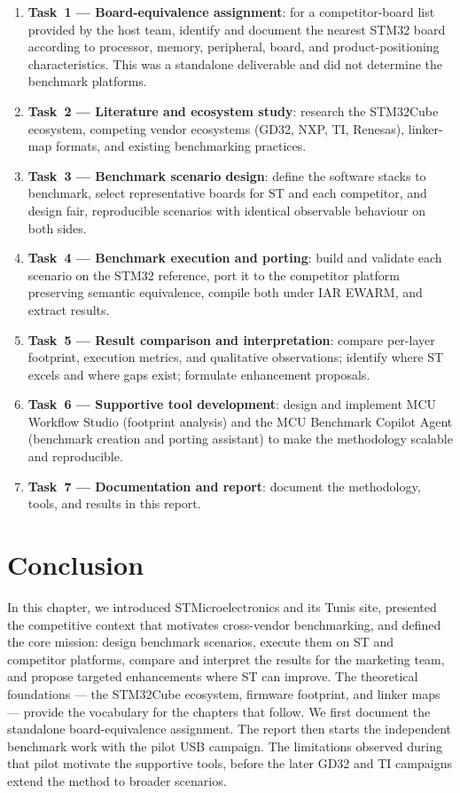 \begin{enumerate}
\item \textbf{Task~1 --- Board-equivalence assignment}: for a competitor-board list
provided by the host team, identify and document the nearest STM32 board according to
processor, memory, peripheral, board, and product-positioning characteristics. This was a
standalone deliverable and did not determine the benchmark platforms.
\item \textbf{Task~2 --- Literature and ecosystem study}: research the STM32Cube
ecosystem, competing vendor ecosystems (GD32, NXP, TI, Renesas), linker-map formats,
and existing benchmarking practices.
\item \textbf{Task~3 --- Benchmark scenario design}: define the software stacks to
benchmark, select representative boards for ST and each competitor, and design fair,
reproducible scenarios with identical observable behaviour on both sides.
\item \textbf{Task~4 --- Benchmark execution and porting}: build and validate each
scenario on the STM32 reference, port it to the competitor platform preserving semantic
equivalence, compile both under IAR EWARM, and extract results.
\item \textbf{Task~5 --- Result comparison and interpretation}: compare per-layer
footprint, execution metrics, and qualitative observations; identify where ST excels and
where gaps exist; formulate enhancement proposals.
\item \textbf{Task~6 --- Supportive tool development}: design and implement
MCU Workflow Studio (footprint analysis) and the MCU Benchmark Copilot Agent (benchmark
creation and porting assistant) to make the methodology scalable and reproducible.
\item \textbf{Task~7 --- Documentation and report}: document the methodology, tools, and
results in this report.
\end{enumerate}

\section*{Conclusion}

In this chapter, we introduced STMicroelectronics and its Tunis site, presented the
competitive context that motivates cross-vendor benchmarking, and defined the core mission:
design benchmark scenarios, execute them on ST and competitor platforms, compare and
interpret the results for the marketing team, and propose targeted enhancements where ST can
improve. The theoretical foundations --- the STM32Cube ecosystem, firmware footprint, and
linker maps --- provide the vocabulary for the chapters that follow. We first document the
standalone board-equivalence assignment. The report then starts the independent benchmark
work with the pilot USB campaign. The limitations observed during that pilot motivate the
supportive tools, before the later GD32 and TI campaigns extend the method to broader
scenarios.
